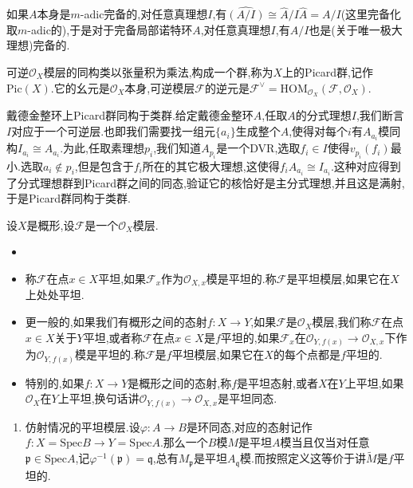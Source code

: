如果$A$本身是$m$-adic完备的,对任意真理想$I$,有$\widehat{(A/I)}\cong\widehat{A}/I\widehat{A}=A/I$(这里完备化取$m$-adic的),于是对于完备局部诺特环$A$,对任意真理想$I$,有$A/I$也是(关于唯一极大理想)完备的.

可逆$\mathscr{O}_X$模层的同构类以张量积为乘法,构成一个群,称为$X$上的Picard群,记作$\mathrm{Pic}(X)$.它的幺元是$\mathscr{O}_X$本身,可逆模层$\mathscr{F}$的逆元是$\mathscr{F}^{\vee}=\mathrm{HOM}_{\mathscr{O}_X}(\mathscr{F},\mathscr{O}_X)$.
\item 戴德金整环上Picard群同构于类群.给定戴德金整环$A$,任取$A$的分式理想$I$,我们断言$I$对应于一个可逆层.也即我们需要找一组元$\{a_i\}$生成整个$A$,使得对每个$i$有$A_{a_i}$模同构$I_{a_i}\cong A_{a_i}$.为此,任取素理想$p_i$,我们知道$A_{p_i}$是一个DVR,选取$f_i\in I$使得$v_{p_i}(f_i)$最小.选取$a_i\not\in p_i$,但是包含于$f_i$所在的其它极大理想,这使得$f_iA_{a_i}\cong I_{a_i}$.这种对应得到了分式理想群到Picard群之间的同态,验证它的核恰好是主分式理想,并且这是满射,于是Picard群同构于类群.


设$X$是概形,设$\mathscr{F}$是一个$\mathscr{O}_X$模层.
\begin{itemize}
	\item 
	\item 称$\mathscr{F}$在点$x\in X$平坦,如果$\mathscr{F}_x$作为$\mathscr{O}_{X,x}$模是平坦的.称$\mathscr{F}$是平坦模层,如果它在$X$上处处平坦.
	\item 更一般的,如果我们有概形之间的态射$f:X\to Y$,如果$\mathscr{F}$是$\mathscr{O}_X$模层,我们称$\mathscr{F}$在点$x\in X$关于$Y$平坦,或者称$\mathscr{F}$在点$x\in X$是$f$平坦的,如果$\mathscr{F}_x$在$\mathscr{O}_{Y,f(x)}\to\mathscr{O}_{X,x}$下作为$\mathscr{O}_{Y,f(x)}$模是平坦的.称$\mathscr{F}$是$f$平坦模层,如果它在$X$的每个点都是$f$平坦的.
	\item 特别的,如果$f:X\to Y$是概形之间的态射,称$f$是平坦态射,或者$X$在$Y$上平坦,如果$\mathscr{O}_X$在$Y$上平坦,换句话讲$\mathscr{O}_{Y,f(x)}\to\mathscr{O}_{X,x}$是平坦同态.
\end{itemize}
\begin{enumerate}
	
	\item 仿射情况的平坦模层.设$\varphi:A\to B$是环同态,对应的态射记作$f:X=\mathrm{Spec}B\to Y=\mathrm{Spec}A$.那么一个$B$模$M$是平坦$A$模当且仅当对任意$\mathfrak{p}\in\mathrm{Spec}A$,记$\varphi^{-1}(\mathfrak{p})=\mathfrak{q}$,总有$M_{\mathfrak{p}}$是平坦$A_{\mathfrak{q}}$模.而按照定义这等价于讲$\widetilde{M}$是$f$平坦的.
\end{enumerate}


